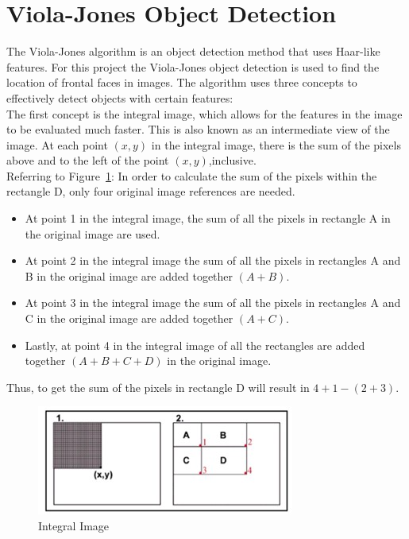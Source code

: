 \section{Viola-Jones Object Detection}
\begin{flushleft}
The Viola-Jones algorithm \citep{viola} is an object detection method that uses Haar-like features. For this project the Viola-Jones object detection is used to find the location of frontal faces in images. The algorithm uses three concepts to effectively detect objects with certain features:\\

The first concept is the integral image, which allows for the features in the image to be evaluated much faster. This is also known as an intermediate view of the image. At each point $(x,y)$ in the integral image, there is the sum of the pixels above and to the left of the point $(x,y)$,inclusive.\\
Referring to Figure~\ref{fig: integral}:
In order to calculate the sum of the pixels within the rectangle D, only four original  image references are needed.

\begin{itemize}
\item At point 1 in the integral image, the sum of all the pixels in rectangle A in the original image are used. 
\item At point 2 in the integral image the sum of all the pixels in rectangles A and B in the original image are added together $(A+B)$. 
\item At point 3 in the integral image the sum of all the pixels in rectangles A and C in the original image are added together $(A+C)$. 
\item Lastly, at point 4 in the integral image of all the rectangles are added together $(A+B+C+D)$ in the original image. 
\end{itemize}
Thus, to get the sum of the pixels in rectangle D will result in $4+1-(2+3)$.
\end{flushleft}
\begin{figure}[H]
  \centering
  \includegraphics[scale=0.95]{1}
  \caption{Integral Image \citep{viola}}
  \label{fig: integral}
\end{figure}
